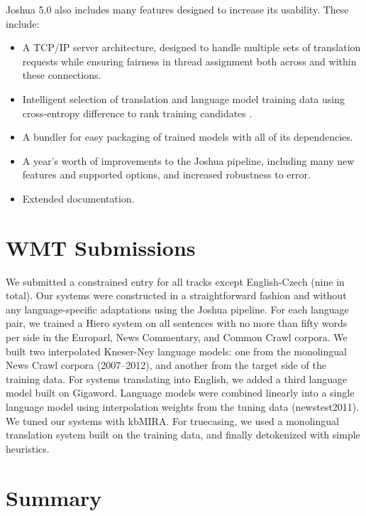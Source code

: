 \documentclass[11pt]{article}
\begin{document}
Joshua 5.0 also includes many features designed to increase its
usability.  These include:

\begin{itemize}
\item A TCP/IP server architecture, designed to handle multiple sets
  of translation requests while ensuring fairness in thread assignment
  both across and within these connections.
\item Intelligent selection of translation and language model training
  data \cite{moore2010intelligent,axelrod-he-gao:2011:EMNLP} using
  cross-entropy difference to rank training candidates
  \cite{orland-taus}.
\item A bundler for easy packaging of trained models with
  all of its dependencies.
\item A year's worth of improvements to the Joshua pipeline, including many
  new features and supported options, and increased robustness to error.
\item Extended documentation.
\end{itemize}


\section{WMT Submissions}

We submitted a constrained entry for all tracks except English-Czech
(nine in total). Our systems were constructed in a straightforward
fashion and without any language-specific adaptations using the Joshua
pipeline. For each language pair, we trained a Hiero system on all
sentences with no more than fifty words per side in the Europarl, News
Commentary, and Common Crawl corpora. We built two interpolated Kneser-Ney language
models: one from the monolingual News Crawl corpora (2007--2012), and
another from the target side of the training data.  For systems
translating into English, we added a third language model built on
Gigaword. Language models were combined linearly into a single
language model using interpolation weights from the tuning data
(newstest2011).  We tuned our systems with kbMIRA. For truecasing, 
we used a monolingual translation system built on the training data,
and finally detokenized with simple heuristics.

\section{Summary}
\end{document}
